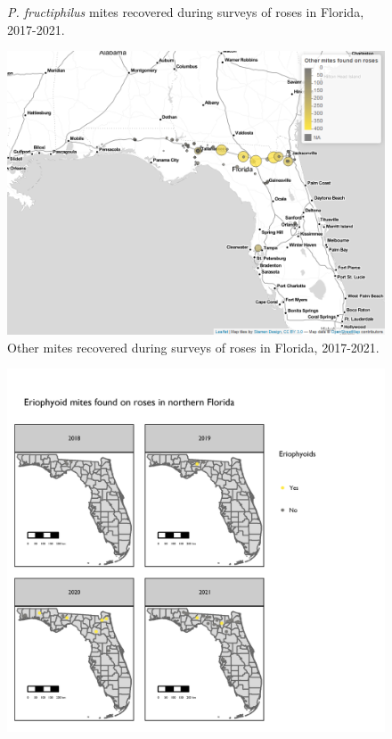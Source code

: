 \documentclass[12pt,final,CPage]{ufthesis}
\begin{document}
{\begin{figure}[p]
{  }

  \caption{\textit{P. fructiphilus} mites recovered during surveys of roses in Florida, 2017-2021.}\label{fig:survey-map-1}
  \end{figure}
  \begin{figure}[p]

  {\centering \includegraphics[width=1\linewidth]{figure/rrv_survey_map_fl_other} 

  }

  \caption{Other mites recovered during surveys of roses in Florida, 2017-2021.}\label{fig:survey-map-2}
  \end{figure}
  \begin{figure}[p]

  {\centering \includegraphics[width=1\linewidth]{figure/rrv_survey_map_years_pf} 

}
\end{figure}}
\end{document}
